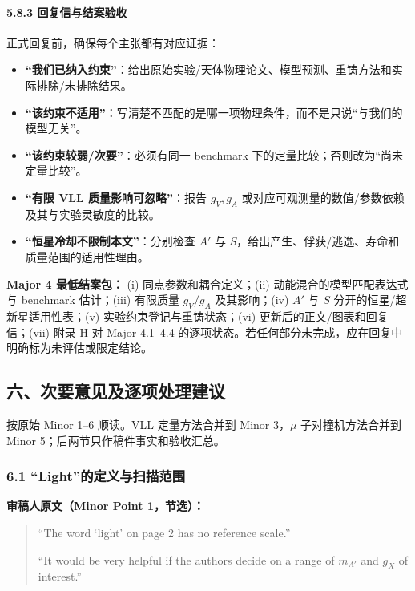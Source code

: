 \documentclass[
  chinese,
  UTF8]{ctexart}
\providecommand{\tightlist}{%
  \setlength{\itemsep}{0pt}\setlength{\parskip}{0pt}}
\begin{document}
\paragraph{5.8.3
回复信与结案验收}\label{ux56deux590dux4fe1ux4e0eux7ed3ux6848ux9a8cux6536}

正式回复前，确保每个主张都有对应证据：

\begin{itemize}
\tightlist
\item
  \textbf{``我们已纳入约束''}：给出原始实验/天体物理论文、模型预测、重铸方法和实际排除/未排除结果。
\item
  \textbf{``该约束不适用''}：写清楚不匹配的是哪一项物理条件，而不是只说``与我们的模型无关''。
\item
  \textbf{``该约束较弱/次要''}：必须有同一 benchmark
  下的定量比较；否则改为``尚未定量比较''。
\item
  \textbf{``有限 VLL 质量影响可忽略''}：报告 \(g_V,g_A\)
  或对应可观测量的数值/参数依赖及其与实验灵敏度的比较。
\item
  \textbf{``恒星冷却不限制本文''}：分别检查 \(A'\) 与
  \(S\)，给出产生、俘获/逃逸、寿命和质量范围的适用性理由。
\end{itemize}

\textbf{Major 4 最低结案包：} (i) 同点参数和耦合定义；(ii)
动能混合的模型匹配表达式与 benchmark 估计；(iii) 有限质量 \(g_V/g_A\)
及其影响；(iv) \(A'\) 与 \(S\) 分开的恒星/超新星适用性表；(v)
实验约束登记与重铸状态；(vi) 更新后的正文/图表和回复信；(vii) 附录 H 对
Major 4.1--4.4
的逐项状态。若任何部分未完成，应在回复中明确标为未评估或限定结论。

\subsection{六、次要意见及逐项处理建议}\label{ux516dux6b21ux8981ux610fux89c1ux53caux9010ux9879ux5904ux7406ux5efaux8bae}

按原始 Minor 1--6 顺读。VLL 定量方法合并到 Minor 3，\ensuremath{\mu}
子对撞机方法合并到 Minor 5；后两节只作稿件事实和验收汇总。

\subsubsection{6.1
``Light''的定义与扫描范围}\label{lightux7684ux5b9aux4e49ux4e0eux626bux63cfux8303ux56f4}

\textbf{审稿人原文（Minor Point 1，节选）：}

\begin{quote}
``The word `light' on page 2 has no reference scale.''

``It would be very helpful if the authors decide on a range of
\(m_{A'}\) and \(g_X\) of interest.''
\end{quote}
\end{document}
